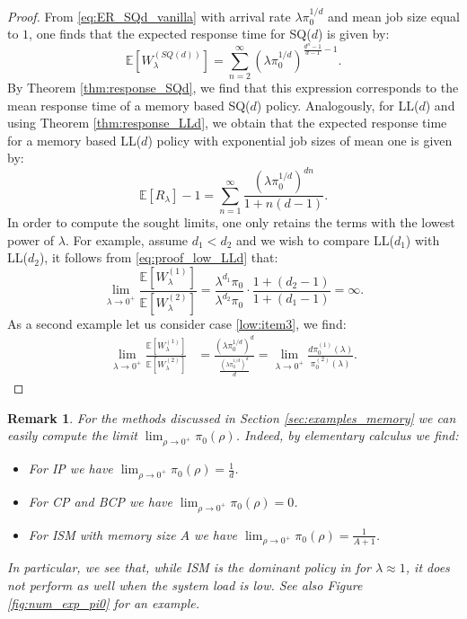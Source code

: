 \documentclass[12pt]{report}
\newcommand{\E}{\mathbb{E}}
\newtheorem{remark}{Remark}
\begin{document}
\begin{proof}
From \eqref{eq:ER_SQd_vanilla} with arrival rate $\lambda \pi_0^{1/d}$ and mean job size equal to $1$, one finds that the expected response time for SQ($d$) is given by:
$$
\E[W_\lambda^{(SQ(d))}]=\sum_{n=2}^\infty (\lambda\pi_0^{1/d})^{\frac{d^n-1}{d-1}-1}.
$$
By Theorem \ref{thm:response_SQd}, we find that this expression corresponds to the mean response time of a memory based SQ($d$) policy. Analogously, for LL($d$) and using Theorem \ref{thm:response_LLd}, we obtain that the expected response time for a memory based LL($d$) policy with exponential job sizes of mean one is given by:
\begin{equation} \label{eq:proof_low_LLd}
\E[R_\lambda]-1=\sum_{n=1}^\infty \frac{(\lambda\pi_0^{1/d})^{dn}}{1+n(d-1)}.
\end{equation} In order to compute the sought limits, one only retains the terms with the lowest power of $\lambda$. For example, assume $d_1< d_2$ and we wish to compare LL($d_1$) with LL($d_2$), it follows from \eqref{eq:proof_low_LLd} that:
$$
\lim_{\lambda \rightarrow 0^+} \frac{\E[W_\lambda^{(1)}]}{\E[W_\lambda^{(2)}]}= \frac{\lambda^{d_1} \pi_0}{\lambda^{d_2} \pi_0} \cdot \frac{1+(d_2-1)}{1+(d_1-1)} = \infty.
$$
As a second example let us consider case \eqref{low:item3}, we find:
\begin{align*}
\lim_{\lambda \rightarrow 0^+} \frac{\E[W_\lambda^{(1)}]}{\E[W_\lambda^{(2)}]}&= \frac{(\lambda\pi_0^{1/d})^d}{\frac{(\lambda\pi_0^{1/d})^d}{d}} =\lim_{\lambda\rightarrow 0^+} \frac{d\pi_0^{(1)}(\lambda)}{\pi_0^{(2)}(\lambda)}.
\end{align*}
\end{proof}
\begin{remark}
For the methods discussed in Section \ref{sec:examples_memory} we can easily compute the limit $\lim_{\rho \rightarrow 0^+} \pi_0(\rho)$. Indeed, by elementary calculus we find:
\begin{itemize}
\item For IP we have $\lim_{\rho \rightarrow 0^+} \pi_0(\rho)=\frac{1}{d}$.
\item For CP and BCP we have $\lim_{\rho \rightarrow 0^+} \pi_0(\rho)=0$.
\item For ISM with memory size $A$ we have $\lim_{\rho \rightarrow 0^+} \pi_0(\rho)=\frac{1}{A+1}$.
\end{itemize}
In particular, we see that, while ISM is the dominant policy in for $\lambda \approx 1$, it does not perform as well when the system load is low. See also Figure \ref{fig:num_exp_pi0} for an example.
\end{remark}
\end{document}

